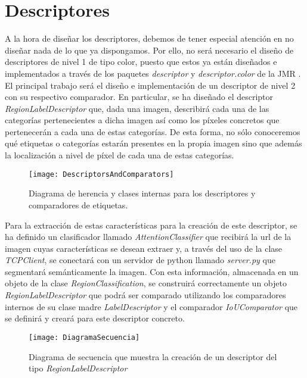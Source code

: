 \newpage
\section{Descriptores}
A la hora de diseñar los descriptores, debemos de tener especial atención en no diseñar nada de lo que ya dispongamos. Por ello, no será necesario el diseño de descriptores de nivel 1 de tipo color, puesto que estos ya están diseñados e implementados a través de los paquetes \emph{descriptor} y \emph{descriptor.color} de la JMR \cite{JMR}.\\

El principal trabajo será el diseño e implementación de un descriptor de nivel 2 con su respectivo comparador. En particular, se ha diseñado el descriptor \emph{RegionLabelDescriptor} que, dada una imagen, describirá cada una de las categorías pertenecientes a dicha imagen así como los píxeles concretos que pertenecerán a cada una de estas categorías. De esta forma, no sólo conoceremos qué etiquetas o categorías estarán presentes en la propia imagen sino que además la localización a nivel de píxel de cada una de estas categorías.\\

\begin{figure}[htpb]
  \centering
  \texttt{[image: DescriptorsAndComparators]}
  \caption{Diagrama de herencia y clases internas para los descriptores y comparadores de etiquetas. \cite{JMR}}
  \label{fig:DescriptorsAndComparators}
\end{figure}

Para la extracción de estas características para la creación de este descriptor, se ha definido un clasificador llamado \emph{AttentionClassifier} que recibirá la url de la imagen cuyas características se desean extraer y, a través del uso de la clase \emph{TCPClient}, se conectará con un servidor de python llamado \emph{server.py} que segmentará semánticamente la imagen. Con esta información, almacenada en un objeto de la clase \emph{RegionClassification}, se construirá correctamente un objeto \emph{RegionLabelDescriptor} que podrá ser comparado utilizando los comparadores internos de su clase madre \emph{LabelDescriptor} y el comparador \emph{IoUComparator} que se definirá y creará para este descriptor concreto.\\

\begin{figure}[htpb]
  \centering
  \texttt{[image: DiagramaSecuencia]}
  \caption{Diagrama de secuencia que muestra la creación de un descriptor del tipo \emph{RegionLabelDescriptor}}
  \label{fig:DiagramaSecuencia}
\end{figure}

